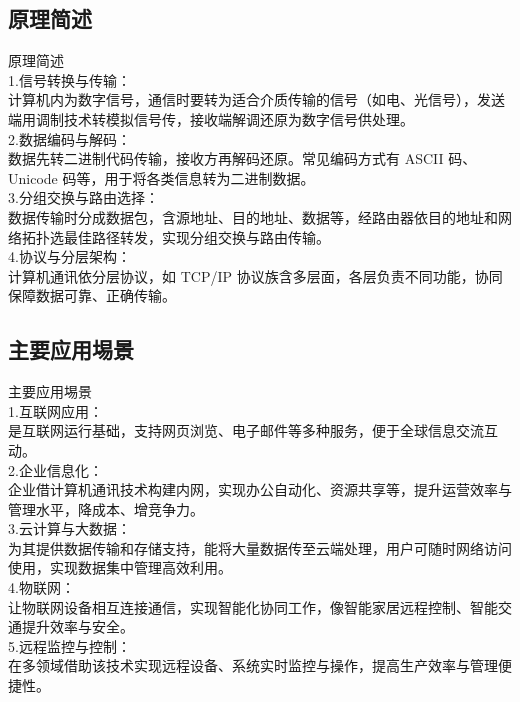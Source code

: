 \documentclass[supercite]{Experimental_Report}
\theoremstyle{definition}
\begin{document}
	\subsection{原理简述}
	原理简述\\
	1.信号转换与传输：\\计算机内为数字信号，通信时要转为适合介质传输的信号（如电、光信号），发送端用调制技术转模拟信号传，接收端解调还原为数字信号供处理。\\
	2.数据编码与解码：\\数据先转二进制代码传输，接收方再解码还原。常见编码方式有 ASCII 码、Unicode 码等，用于将各类信息转为二进制数据。\\
	3.分组交换与路由选择：\\数据传输时分成数据包，含源地址、目的地址、数据等，经路由器依目的地址和网络拓扑选最佳路径转发，实现分组交换与路由传输。\\
	4.协议与分层架构：\\计算机通讯依分层协议，如 TCP/IP 协议族含多层面，各层负责不同功能，协同保障数据可靠、正确传输。
	
	
	\subsection{主要应用埸景}
	主要应用埸景\\
	1.互联网应用：\\是互联网运行基础，支持网页浏览、电子邮件等多种服务，便于全球信息交流互动。\\
	2.企业信息化：\\企业借计算机通讯技术构建内网，实现办公自动化、资源共享等，提升运营效率与管理水平，降成本、增竞争力。\\
	3.云计算与大数据：\\为其提供数据传输和存储支持，能将大量数据传至云端处理，用户可随时网络访问使用，实现数据集中管理高效利用。\\
	4.物联网：\\让物联网设备相互连接通信，实现智能化协同工作，像智能家居远程控制、智能交通提升效率与安全。\\
	5.远程监控与控制：\\在多领域借助该技术实现远程设备、系统实时监控与操作，提高生产效率与管理便捷性。
	
	
\end{document}
